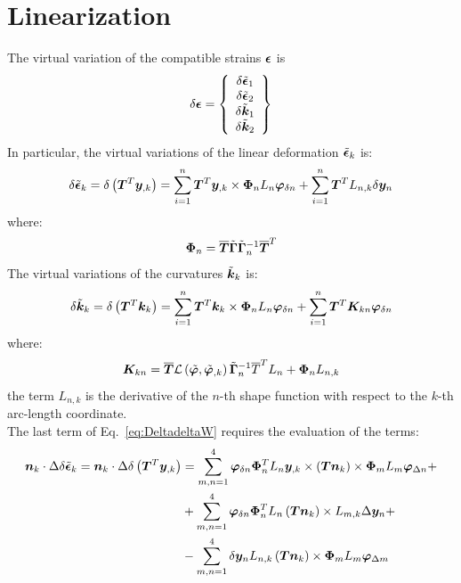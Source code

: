 \section{Linearization}
The virtual variation of the compatible strains $\T{\epsilon}$ is
\begin{equation}
\delta \T{\epsilon} =
\cubr{\vvect{c}{
\delta \tilde{\T{\epsilon} }_1 \\
\delta \tilde{\T{\epsilon} }_2 \\
\delta \tilde{\T{k} }_1 \\
\delta \tilde{\T{k} }_2 \\
}}
\end{equation}
In particular, the virtual variations of the linear deformation $\tilde{\T{\epsilon} }_k $ is:
\begin{equation}
\delta \tilde{\T{\epsilon} }_k  = \delta \plbr{ \TT{T}^T \T{y}_{,k} } =
\sum_{i=1}^n \TT{T}^T \T{y}_{,k} \times \TT{\Phi}_{n} L_n \T{\varphi}_{\delta n} + \sum_{i=1}^n \TT{T}^T L_{n,k} \delta \T{y}_{n}
\label{eq:delta_epsilon}
\end{equation}
where:
\begin{equation}
\TT{\Phi}_{n} = \overline{\TT{T}}  \tilde{ \TT{\Gamma} } \tilde{ \TT{\Gamma} }_n^{-1} \overline{\TT{T}}^T
\end{equation}
The  virtual variations of the curvatures $\tilde{\T{k} }_k$ is:
\begin{equation}
\delta \tilde{\T{k} }_k = \delta \plbr{ \TT{T}^T \T{k}_k } =
\sum_{i=1}^n \TT{T}^T \T{k}_k \times \TT{\Phi}_n L_n \T{\varphi}_{\delta n} + \sum_{i=1}^n \TT{T}^T \TT{K}_{kn} \T{\varphi}_{\delta n}
\label{eq:delta_k}
\end{equation}
where:
\begin{equation}
\TT{K}_{kn} = \overline{\TT{T}} \mathcal{L} \plbr{ \tilde{\T{\varphi}}, \tilde{\T{\varphi}}_{,k} } \tilde{ \TT{\Gamma} }_{n}^{-1} \overline{T}^T L_n + \TT{\Phi}_{n} L_{n,k}
\end{equation}
the term $L_{n,k}$ is the derivative of the $n$-th shape function with respect to the $k$-th arc-length coordinate.\\
The last term of Eq.~\ref{eq:DeltadeltaW} requires the evaluation of the terms:
\begin{equation}
\begin{split}
\T{n}_k \cdot \Delta \delta \tilde{\T{\epsilon}}_k =
\T{n}_k \cdot \Delta \delta \plbr{ \TT{T}^T \T{y}_{,k} } & =
\sum_{m,n=1}^{4} \T{\varphi}_{\delta n} \TT{\Phi}_{n}^T L_n \T{y}_{,k} \times \plbr{ \TT{T} \T{n}_k } \times \TT{\Phi}_m L_m  \T{\varphi}_{\Delta n} + \\
& + \sum_{m,n=1}^{4} \T{\varphi}_{\delta n} \TT{\Phi}_{n}^T L_n \plbr{\TT{T} \T{n}_k} \times L_{m,k} \Delta \T{y}_{n} + \\
& - \sum_{m,n=1}^{4} \delta \T{y}_n L_{n,k} \plbr{\TT{T} \T{n}_k} \times \TT{\Phi}_m L_m \T{\varphi}_{\Delta m}
\end{split}
\label{eq:Deltadelta_epsilon}
\end{equation}

